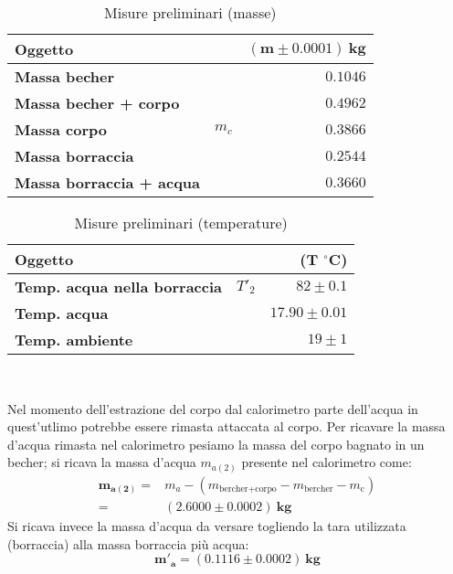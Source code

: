 \documentclass{article}
\begin{document}
	\vspace{1cm}
	\begin{minipage}{0.4\textwidth}
		\begin{table}[H] \centering
			\begin{small}
				\begin{tabular}{@{}lrr@{}}\toprule
					\textbf{Oggetto}&  & \(\boldsymbol{(m \pm 0.0001) \SI{}{\kilogram}}\) \\ \midrule
					\textbf{Massa becher}	&	 & \(0.1046\)   \\  \hdashline
					\textbf{Massa becher + corpo}	& 	 & \(0.4962\)   \\  \hdashline
					\textbf{Massa corpo}	& \(m_{c}\)	 & \(0.3866\)   \\  \hdashline
					\textbf{Massa borraccia}	&	 & \(0.2544\)   \\\hdashline
					\textbf{Massa borraccia + acqua}	&	 & \(0.3660\)   \\  
					\bottomrule
				\end{tabular}
			\end{small}
			\caption{Misure preliminari (masse)}
		\end{table}
	\end{minipage}
	\begin{minipage}{0.6\textwidth}
		\begin{table}[H] \centering
			\begin{small}
				\begin{tabular}{@{}lrr@{}}\toprule
					\textbf{Oggetto}					&  			& \textbf{(\(\boldsymbol{T}\)} \(\boldsymbol{^\circ C}\))\\ \midrule
					\textbf{Temp. acqua nella borraccia}	& 	\(T'_{2}\)		& \(82 \pm 0.1\)	 \\  \hdashline
					\textbf{Temp. acqua}				&					&\(17.90 \pm 0.01\)		 	 \\  \hdashline
					\textbf{Temp. ambiente}				&					& \(19 \pm 1\)		 	  \\  
					\bottomrule
				\end{tabular}
			\end{small}
			\caption{Misure preliminari (temperature)}
		\end{table}
	\end{minipage} \\
	\vspace{0.5cm}
	
	Nel momento dell'estrazione del corpo dal calorimetro parte dell'acqua in quest'utlimo potrebbe essere rimasta attaccata al corpo. Per ricavare la massa d'acqua rimasta nel calorimetro pesiamo la massa del corpo bagnato in un becher; si ricava la massa d'acqua \(m_{a(2)}\) presente nel calorimetro come:
	\begin{align*}
	\boldsymbol{	m_{a(2)} =}& m_{a} - (m_{\text{bercher+corpo}} - m_{\text{bercher}} - m_{\text{c}}) \\
				 \boldsymbol{=}& \boldsymbol{(2.6000 \pm 0.0002) \SI{}{\kilogram}}
	\end{align*}
	Si ricava invece la massa d'acqua da versare togliendo la tara utilizzata (borraccia) alla massa borraccia più acqua:
	\[ 
	\boldsymbol{m'_{a} = (0.1116 \pm	0.0002)\SI{}{\kilogram}}
	\]
	
\end{document}
